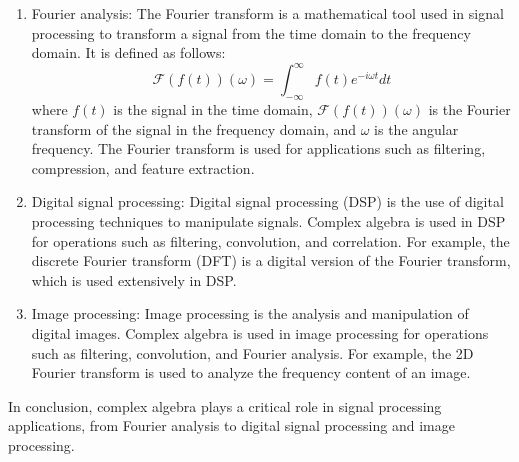 \documentclass{article}
\begin{document}
\begin{enumerate}
\item Fourier analysis: The Fourier transform is a mathematical tool used in signal processing to transform a signal from the time domain to the frequency domain. It is defined as follows:
$$\mathcal{F}(f(t))(\omega)=\int_{-\infty}^{\infty}f(t)e^{-i\omega t}dt$$
where $f(t)$ is the signal in the time domain, $\mathcal{F}(f(t))(\omega)$ is the Fourier transform of the signal in the frequency domain, and $\omega$ is the angular frequency. The Fourier transform is used for applications such as filtering, compression, and feature extraction.
\item Digital signal processing: Digital signal processing (DSP) is the use of digital processing techniques to manipulate signals. Complex algebra is used in DSP for operations such as filtering, convolution, and correlation. For example, the discrete Fourier transform (DFT) is a digital version of the Fourier transform, which is used extensively in DSP.
\item Image processing: Image processing is the analysis and manipulation of digital images. Complex algebra is used in image processing for operations such as filtering, convolution, and Fourier analysis. For example, the 2D Fourier transform is used to analyze the frequency content of an image.
\end{enumerate}
In conclusion, complex algebra plays a critical role in signal processing applications, from Fourier analysis to digital signal processing and image processing.
\end{document}
